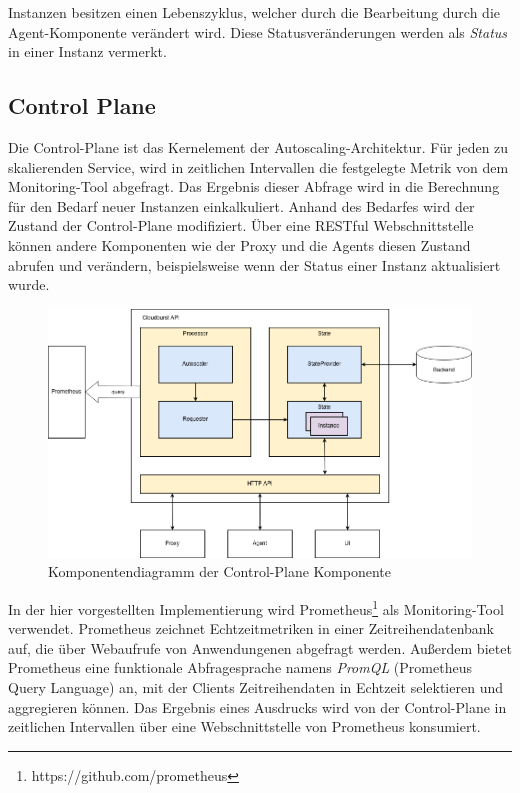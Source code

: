 \documentclass[runningheads]{llncs}
\begin{document}
Instanzen besitzen einen Lebenszyklus, welcher durch die Bearbeitung durch die Agent-Komponente verändert wird. Diese Statusveränderungen werden als \textit{Status} in einer Instanz vermerkt.
	
\subsection{Control Plane} \label{control_plane}

Die Control-Plane ist das Kernelement der Autoscaling-Architektur. Für jeden zu skalierenden Service, wird in zeitlichen Intervallen die festgelegte Metrik von dem Monitoring-Tool abgefragt. Das Ergebnis dieser Abfrage wird in die Berechnung für den Bedarf neuer Instanzen einkalkuliert. Anhand des Bedarfes wird der Zustand der Control-Plane modifiziert. Über eine RESTful Webschnittstelle können andere Komponenten wie der Proxy und die Agents diesen Zustand abrufen und verändern, beispielsweise wenn der Status einer Instanz aktualisiert wurde. \\

\begin{figure}
	\centering
	\includegraphics[width=0.8\linewidth,scale=0.8]{images/autoscaler.png}
	\caption{Komponentendiagramm der Control-Plane Komponente}
\end{figure}

In der hier vorgestellten Implementierung wird Prometheus\footnote{https://github.com/prometheus} als Monitoring-Tool verwendet.  Prometheus zeichnet Echtzeitmetriken in einer Zeitreihendatenbank auf, die über Webaufrufe von Anwendungenen abgefragt werden. Außerdem bietet Prometheus eine funktionale Abfragesprache namens \textit{PromQL} (Prometheus Query Language) an, mit der Clients Zeitreihendaten in Echtzeit selektieren und aggregieren können. Das Ergebnis eines Ausdrucks wird von der Control-Plane in zeitlichen Intervallen über eine Webschnittstelle von Prometheus konsumiert. \\
\end{document}
